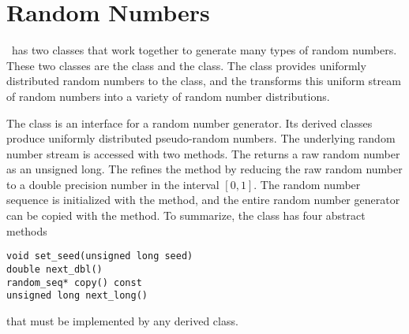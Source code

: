 \chapter{Random Numbers}
\adevs\ has two classes that work together to generate many types of random numbers. These two classes are the  class and the  class. The  class provides uniformly distributed random numbers to the  class, and the  transforms this uniform stream of random numbers into a variety of random number distributions.

The  class is an interface for a random number generator. Its derived classes produce uniformly distributed pseudo-random numbers. The underlying random number stream is accessed with two methods. The  returns a raw random number as an unsigned long. The  refines the  method by reducing the raw random number to a double precision number in the interval $[0,1]$. The random number sequence is initialized with the  method, and the entire random number generator can be copied with the  method. To summarize, the  class has four abstract methods
\begin{verbatim}
void set_seed(unsigned long seed) 
double next_dbl() 
random_seq* copy() const 
unsigned long next_long() 
\end{verbatim}
that must be implemented by any derived class.

